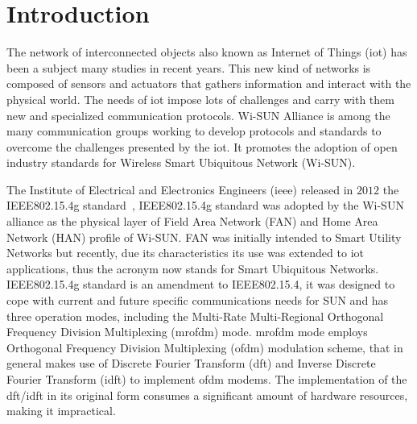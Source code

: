 \chapter*{Introduction}

The network of interconnected objects also known as Internet of Things (\ac{iot}) has been a subject many studies in recent years. This new kind of networks is composed of sensors and actuators that gathers information and interact with the physical world.  The needs of \ac{iot} impose lots of challenges and carry with them new and specialized communication protocols. Wi-SUN Alliance is among the many communication groups working to develop protocols and standards to overcome the challenges presented by the \ac{iot}. It promotes the adoption of open industry standards for Wireless Smart Ubiquitous Network (Wi-SUN). 



 The Institute of Electrical and Electronics Engineers (\ac{ieee}) released in $2012$ the IEEE802.15.4g standard~\cite{sun_std_2012}, IEEE802.15.4g standard was adopted by the Wi-SUN alliance as the physical layer of Field Area Network (FAN)  and  Home Area Network (HAN) profile of Wi-SUN. FAN was initially intended to Smart Utility Networks but recently, due its characteristics its use was extended to \ac{iot} applications, thus the acronym now stands for Smart Ubiquitous Networks.   IEEE802.15.4g standard is an amendment to IEEE802.15.4, it was designed to cope with current and future specific communications needs for SUN and has three operation modes, including the Multi-Rate Multi-Regional Orthogonal Frequency Division Multiplexing (\ac{mrofdm}) mode. \ac{mrofdm} mode employs Orthogonal Frequency Division Multiplexing (\ac{ofdm}) modulation scheme,  that in general makes use of Discrete Fourier Transform  (\ac{dft}) and Inverse Discrete Fourier Transform (\ac{idft}) to implement \ac{ofdm} modems. The implementation of the \ac{dft}/\ac{idft} in its original form consumes a significant amount of hardware resources, making it impractical.

